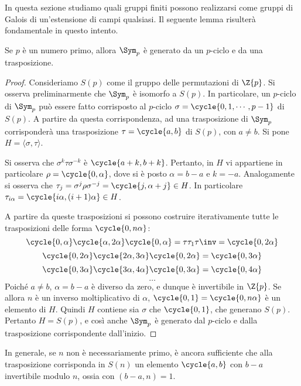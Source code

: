 \documentclass[11pt]{scrartcl}
\begin{document}
	In questa sezione studiamo quali gruppi finiti possono realizzarsi come gruppi di 
	Galois di un'estensione di campi qualsiasi. Il seguente lemma risulterà
	fondamentale in questo intento. 
	
	\begin{lemma}
		\label{lemma3.18}
		Se $p$ è un numero primo, allora $\Sym_p$ è generato da un $p$-ciclo e da una trasposizione.
	\end{lemma}
	
	\begin{proof}
		Consideriamo $S(p)$ come il gruppo delle permutazioni di $\Z{p}$. Si osserva preliminarmente
		che $\Sym_p$ è isomorfo a $S(p)$. In particolare, un $p$-ciclo di $\Sym_p$ può essere fatto
		corrisposto al $p$-ciclo $\sigma = \cycle{0, 1, \cdots, p-1}$
		di $S(p)$. A partire da questa corrispondenza, ad una trasposizione di $\Sym_p$ corrisponderà
		una trasposizione $\tau = \cycle{a, b}$ di $S(p)$, con $a \neq b$. Si pone $H = \langle \sigma, \tau \rangle$. \medskip
		
		
		Si osserva che $\sigma^k \tau \sigma^{-k}$ è $\cycle{a+k, b+k}$. Pertanto, in
		$H$ vi appartiene in particolare $\rho = \cycle{0, \alpha}$, dove si è posto
		$\alpha = b-a$ e $k = -a$.
		Analogamente si osserva che $\tau_j = \sigma^j \rho \sigma^{-j} = \cycle{j, \alpha + j} \in H$. In
		particolare $\tau_{i \alpha} = \cycle{i \alpha, (i+1) \alpha} \in H$. \medskip
		
		
		A partire da queste trasposizioni si possono costruire iterativamente tutte le trasposizioni
		delle forma $\cycle{0, n\alpha}$:
		\[
		\cycle{0, \alpha}\cycle{\alpha, 2\alpha}\cycle{0, \alpha} = \tau \tau_{1} \tau\inv = \cycle{0, 2\alpha}
		\]
		\[
		\cycle{0, 2\alpha}\cycle{2\alpha, 3\alpha}\cycle{0, 2\alpha} = \cycle{0, 3\alpha}
		\]
		\[
		\cycle{0, 3\alpha}\cycle{3\alpha, 4\alpha}\cycle{0, 3\alpha} = \cycle{0, 4\alpha}
		\]
		\[ \ldots \]
		 Poiché $a \neq b$, $\alpha = b - a$ è
		diverso da zero, e dunque è invertibile in $\Z{p}$. Se allora $n$ è un inverso moltiplicativo
		di $\alpha$, $\cycle{0, 1} = \cycle{0, n \alpha}$ è un elemento di $H$.
		Quindi $H$ contiene sia $\sigma$ che $\cycle{0, 1}$, che generano $S(p)$. Pertanto $H = S(p)$,
		e così anche $\Sym_p$ è generato dal $p$-ciclo e dalla trasposizione corrispondente dall'inizio.
	\end{proof}
	
	\begin{remark}
		In generale, se $n$ non è necessariamente primo, è ancora sufficiente che alla trasposizione
		corrisponda in $S(n)$ un elemento $\cycle{a, b}$ con $b-a$ invertibile modulo $n$, ossia
		con $(b-a, n) = 1$. 
	\end{remark}
	
\end{document}
